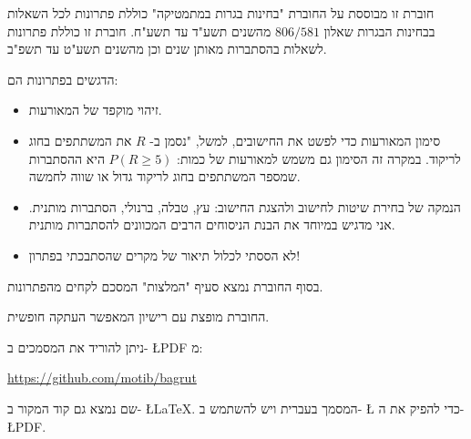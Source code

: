 חוברת זו מבוססת על החוברת "בחינות בגרות במתמטיקה" כוללת פתרונות לכל השאלות בבחינות הבגרות שאלון
$806 / 581$
מהשנים תשע"ד עד תשע"ח. חוברת זו כוללת פתרונות לשאלות בהסתברות מאותן שנים וכן מהשנים תשע"ט עד תשפ"ב. 

הדגשים בפתרונות הם:
\begin{itemize}
\item 
זיהוי מוקפד של המאורעות.
\item
סימון המאורעות כדי לפשט את החישובים, למשל, "נסמן ב-%
$R$
את המשתתפים בחוג לריקוד. במקרה זה הסימון גם משמש למאורעות של כמות:
$P(R\geq 5)$
היא ההסתברות שמספר המשתתפים בחוג לריקוד גדול או שווה לחמשה.

\item
הנמקה של בחירת שיטות לחישוב ולהצגת החישוב: עץ, טבלה, ברנולי, הסתברות מותנית. אני מדגיש במיוחד את הבנת הניסוחים הרבים המכוונים להסתברות מותנית.
\item
לא הססתי לכלול תיאור של מקרים שהסתבכתי בפתרון!
\end{itemize}
בסוף החוברת נמצא סעיף "המלצות" המסכם לקחים מהפתרונות.

החוברת מופצת עם רישיון המאפשר העתקה חופשית.

ניתן להוריד את המסמכים ב-%
\L{PDF}
מ:
\begin{center}
\url{https://github.com/motib/bagrut}
\end{center}
שם נמצא גם קוד המקור ב-%
\L{\LaTeX{}}.
המסמך בעברית ויש להשתמש ב-%
\L{\XeLaTeX{}}
כדי להפיק את ה-%
\L{PDF}.


